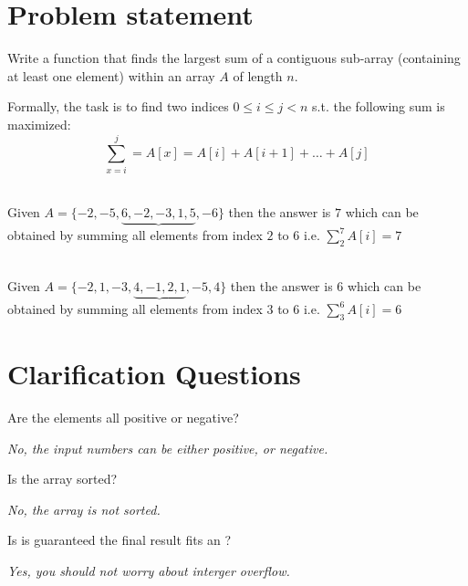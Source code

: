 \section{Problem statement}
\begin{exercise}
Write a function that finds the largest sum of a contiguous sub-array (containing at least one element) within an array $A$
of length $n$.

Formally, the task is to find two indices $ 0 \leq i \leq j < n$ s.t. the following sum is maximized:
\[
\sum_{x=i}^j   = A[x] = A[i] + A[i+1] + \ldots + A[j] 
\]

	\begin{example}
		\hfill \\
		Given $A=\{-2, -5, \underbrace{6, -2, -3, 1, 5}\text{}, -6\}$ then the answer is $7$ which can
		be obtained by summing all elements from index $2$ to $6$ i.e. $\sum_{2}^7 A[i] = 7$
	\end{example}

	\begin{example}
		\hfill \\
		Given $A=\{-2, 1, -3, \underbrace{4, -1, 2, 1}\text{}, -5, 4\}$ then the answer is $6$ which can
		be obtained by summing all elements from index $3$ to $6$ i.e. $\sum_{3}^6 A[i] = 6$
		
	\end{example}
\end{exercise}

\section{Clarification Questions}

\begin{QandA}
	\item Are the elements all positive or negative?
	\begin{answered}
		\textit{No, the input numbers can be either positive, or negative.}
	\end{answered}
	
	\item Is the array sorted?
	\begin{answered}
		\textit{No, the array is not sorted.}
	\end{answered}

	\item Is is guaranteed the final result fits an ?
	\begin{answered}
		\textit{Yes, you should not worry about interger overflow.}
	\end{answered}
	
\end{QandA}

